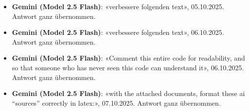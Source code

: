 \documentclass[12pt, a4paper]{article}
\begin{document}
\begin{itemize}
    \item \textbf{Gemini (Model 2.5 Flash)}: «verbessere folgenden text», 05.10.2025. Antwort ganz übernommen.
    
    \item \textbf{Gemini (Model 2.5 Flash)}: «verbessere folgenden text», 06.10.2025. Antwort ganz übernommen.
    
    \item \textbf{Gemini (Model 2.5 Flash)}: «Comment this entire code for readability, and so that someone who has never seen this code can understand it», 06.10.2025. Antwort ganz übernommen.
    
    \item \textbf{Gemini (Model 2.5 Flash)}: «with the attached documents, format these ai ``sources'' correctly in latex:», 07.10.2025. Antwort ganz übernommen.
    
\end{itemize}
\end{document}
